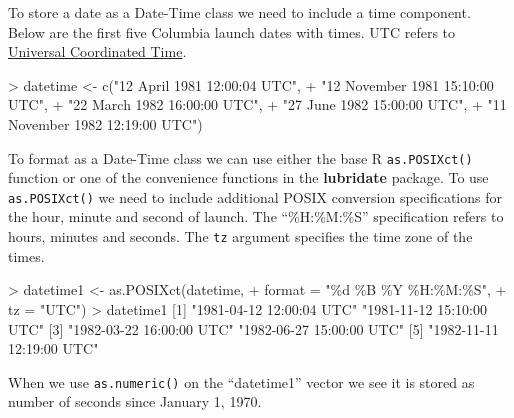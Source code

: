 \documentclass[
]{book}
\newenvironment{Shaded}{\begin{snugshade}}{\end{snugshade}}
\newcommand{\AttributeTok}[1]{\textcolor[rgb]{0.77,0.63,0.00}{#1}}
\newcommand{\DecValTok}[1]{\textcolor[rgb]{0.00,0.00,0.81}{#1}}
\newcommand{\FunctionTok}[1]{\textcolor[rgb]{0.00,0.00,0.00}{#1}}
\newcommand{\NormalTok}[1]{#1}
\newcommand{\OtherTok}[1]{\textcolor[rgb]{0.56,0.35,0.01}{#1}}
\newcommand{\SpecialCharTok}[1]{\textcolor[rgb]{0.00,0.00,0.00}{#1}}
\newcommand{\StringTok}[1]{\textcolor[rgb]{0.31,0.60,0.02}{#1}}
\begin{document}
To store a date as a Date-Time class we need to include a time component. Below are the first five Columbia launch dates with times. UTC refers to \href{https://en.wikipedia.org/wiki/Coordinated_Universal_Time}{Universal Coordinated Time}.

\begin{Shaded}
\begin{Highlighting}[]
\SpecialCharTok{\textgreater{}}\NormalTok{ datetime }\OtherTok{\textless{}{-}} \FunctionTok{c}\NormalTok{(}\StringTok{"12 April 1981 12:00:04 UTC"}\NormalTok{,}
\SpecialCharTok{+}               \StringTok{"12 November 1981 15:10:00 UTC"}\NormalTok{,}
\SpecialCharTok{+}               \StringTok{"22 March 1982 16:00:00 UTC"}\NormalTok{,}
\SpecialCharTok{+}               \StringTok{"27 June 1982 15:00:00 UTC"}\NormalTok{,}
\SpecialCharTok{+}               \StringTok{"11 November 1982 12:19:00 UTC"}\NormalTok{)}
\end{Highlighting}
\end{Shaded}

To format as a Date-Time class we can use either the base R \texttt{as.POSIXct()} function or one of the convenience functions in the \textbf{lubridate} package. To use \texttt{as.POSIXct()} we need to include additional POSIX conversion specifications for the hour, minute and second of launch. The ``\%H:\%M:\%S'' specification refers to hours, minutes and seconds. The \texttt{tz} argument specifies the time zone of the times.

\begin{Shaded}
\begin{Highlighting}[]
\SpecialCharTok{\textgreater{}}\NormalTok{ datetime1 }\OtherTok{\textless{}{-}} \FunctionTok{as.POSIXct}\NormalTok{(datetime, }
\SpecialCharTok{+}                         \AttributeTok{format =} \StringTok{"\%d \%B \%Y \%H:\%M:\%S"}\NormalTok{, }
\SpecialCharTok{+}                         \AttributeTok{tz =} \StringTok{"UTC"}\NormalTok{)}
\SpecialCharTok{\textgreater{}}\NormalTok{ datetime1}
\NormalTok{[}\DecValTok{1}\NormalTok{] }\StringTok{"1981{-}04{-}12 12:00:04 UTC"} \StringTok{"1981{-}11{-}12 15:10:00 UTC"}
\NormalTok{[}\DecValTok{3}\NormalTok{] }\StringTok{"1982{-}03{-}22 16:00:00 UTC"} \StringTok{"1982{-}06{-}27 15:00:00 UTC"}
\NormalTok{[}\DecValTok{5}\NormalTok{] }\StringTok{"1982{-}11{-}11 12:19:00 UTC"}
\end{Highlighting}
\end{Shaded}

When we use \texttt{as.numeric()} on the ``datetime1'' vector we see it is stored as number of seconds since January 1, 1970.
\end{document}
